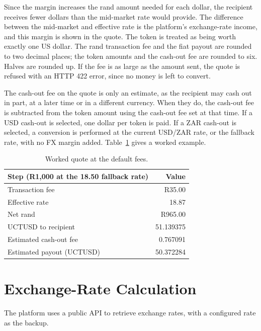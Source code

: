 \documentclass[11pt,a4paper]{article}
\begin{document}
Since the margin increases the rand amount needed for each dollar, the recipient receives fewer dollars than the mid-market rate would provide. The difference between the mid-market and effective rate is the platform's exchange-rate income, and this margin is shown in the quote. The token is treated as being worth exactly one US dollar. The rand transaction fee and the fiat payout are rounded to two decimal places; the token amounts and the cash-out fee are rounded to six. Halves are rounded up. If the fee is as large as the amount sent, the quote is refused with an HTTP 422 error, since no money is left to convert.

The cash-out fee on the quote is only an estimate, as the recipient may cash out in part, at a later time or in a different currency. When they do, the cash-out fee is subtracted from the token amount using the cash-out fee set at that time. If a USD cash-out is selected, one dollar per token is paid. If a ZAR cash-out is selected, a conversion is performed at the current USD/ZAR rate, or the fallback rate, with no FX margin added. Table~\ref{tab:worked} gives a worked example.

\begin{table}[H]
\centering\small
{}
\begin{tabular}{@{}lr@{}}
\toprule
\rowcolor{headbg}\textbf{Step (R1,000 at the 18.50 fallback rate)} & \textbf{Value} \\
\midrule
Transaction fee            & R35.00 \\
Effective rate             & 18.87 \\
Net rand                   & R965.00 \\
UCTUSD to recipient        & 51.139375 \\
Estimated cash-out fee     & 0.767091 \\
Estimated payout (UCTUSD)  & 50.372284 \\
\bottomrule
\end{tabular}
\caption{Worked quote at the default fees.}
\label{tab:worked}
\end{table}

\section{Exchange-Rate Calculation}\label{sec:fx}

The platform uses a public API to retrieve exchange rates, with a configured rate as the backup.
\end{document}
